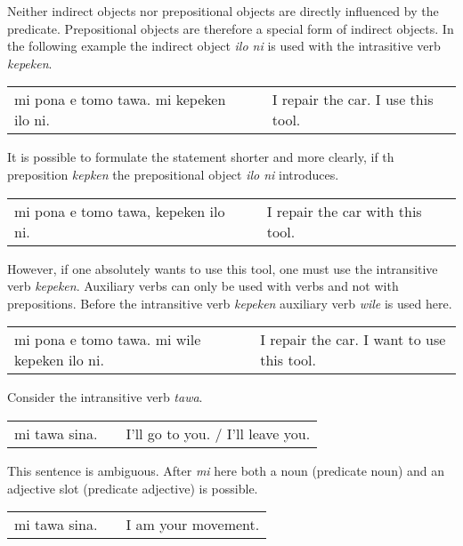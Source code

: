 Neither indirect objects nor prepositional objects are directly influenced by the predicate.
Prepositional objects are therefore a special form of indirect objects.
In the following example the indirect object \textit{ilo ni} is used with the intrasitive verb \textit{kepeken}.

\begin{supertabular}{p{5,5cm}|ll}
    mi pona e tomo tawa. mi kepeken ilo ni. &  & I repair the car. I use this tool. \\
\end{supertabular}

It is possible to formulate the statement shorter and more clearly, if th preposition \textit{kepken} the prepositional object \textit{ilo ni} introduces.

\begin{supertabular}{p{5,5cm}|ll}
    mi pona e tomo tawa, kepeken ilo ni. &  & I repair the car with this tool. \\
\end{supertabular}

However, if one absolutely wants to use this tool, one must use the intransitive verb \textit{kepeken}.
Auxiliary verbs can only be used with verbs and not with prepositions.
Before the intransitive verb \textit{kepeken} auxiliary verb \textit{wile} is used here.

\begin{supertabular}{p{5,5cm}|ll}
    mi pona e tomo tawa. mi wile kepeken ilo ni. &  & I repair the car. I want to use this tool. \\
\end{supertabular}

%
%
Consider the intransitive verb \textit{tawa}.

\begin{supertabular}{p{5,5cm}|ll}
    mi tawa sina. &  & I'll go to you. / I'll leave you. \\ %
\end{supertabular}

This sentence is ambiguous.
After \textit{mi} here both a noun (predicate noun) and an adjective slot (predicate adjective) is possible.

\begin{supertabular}{p{5,5cm}|ll}
    mi tawa sina. &  & I am your movement. \\ %
\end{supertabular}

